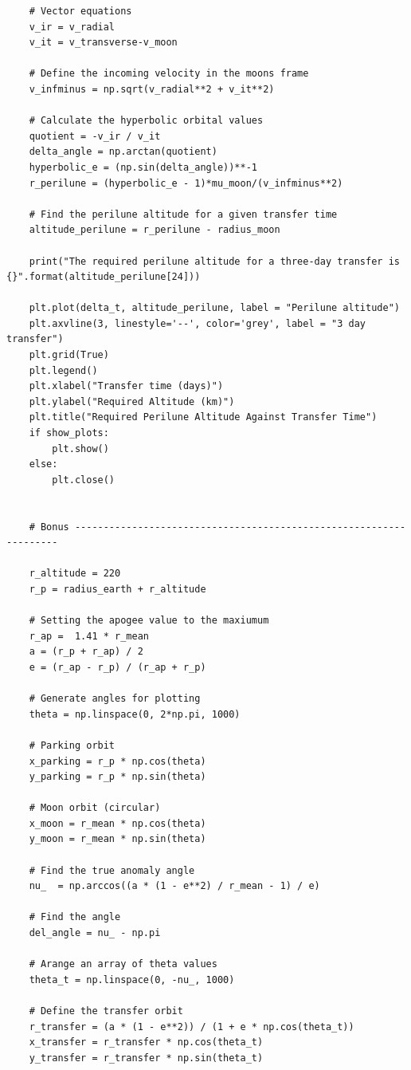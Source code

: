 \documentclass[12pt,twocolumn]{article}  %
\begin{document}
\begin{lstlisting}
    # Vector equations
    v_ir = v_radial
    v_it = v_transverse-v_moon
    
    # Define the incoming velocity in the moons frame
    v_infminus = np.sqrt(v_radial**2 + v_it**2)
    
    # Calculate the hyperbolic orbital values
    quotient = -v_ir / v_it
    delta_angle = np.arctan(quotient)
    hyperbolic_e = (np.sin(delta_angle))**-1
    r_perilune = (hyperbolic_e - 1)*mu_moon/(v_infminus**2)
    
    # Find the perilune altitude for a given transfer time
    altitude_perilune = r_perilune - radius_moon
    
    print("The required perilune altitude for a three-day transfer is {}".format(altitude_perilune[24]))
    
    plt.plot(delta_t, altitude_perilune, label = "Perilune altitude")
    plt.axvline(3, linestyle='--', color='grey', label = "3 day transfer")
    plt.grid(True)
    plt.legend()
    plt.xlabel("Transfer time (days)")
    plt.ylabel("Required Altitude (km)")
    plt.title("Required Perilune Altitude Against Transfer Time")
    if show_plots:
        plt.show()
    else:
        plt.close()
    
    
    # Bonus -------------------------------------------------------------------
    
    r_altitude = 220
    r_p = radius_earth + r_altitude
    
    # Setting the apogee value to the maxiumum
    r_ap =  1.41 * r_mean
    a = (r_p + r_ap) / 2
    e = (r_ap - r_p) / (r_ap + r_p)
    
    # Generate angles for plotting
    theta = np.linspace(0, 2*np.pi, 1000)
    
    # Parking orbit 
    x_parking = r_p * np.cos(theta)
    y_parking = r_p * np.sin(theta)
    
    # Moon orbit (circular)
    x_moon = r_mean * np.cos(theta)
    y_moon = r_mean * np.sin(theta)
    
    # Find the true anomaly angle 
    nu_  = np.arccos((a * (1 - e**2) / r_mean - 1) / e)
    
    # Find the angle 
    del_angle = nu_ - np.pi
    
    # Arange an array of theta values
    theta_t = np.linspace(0, -nu_, 1000)
    
    # Define the transfer orbit
    r_transfer = (a * (1 - e**2)) / (1 + e * np.cos(theta_t))
    x_transfer = r_transfer * np.cos(theta_t)
    y_transfer = r_transfer * np.sin(theta_t)
    

\end{lstlisting}
\end{document}
